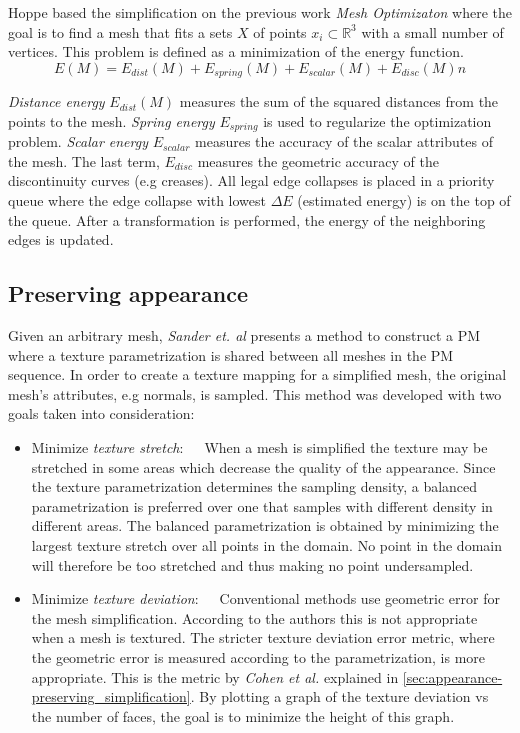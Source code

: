 Hoppe based the simplification on the previous work \emph{Mesh Optimizaton} \cite{hoppe1993mesh} where the goal is to find a mesh that fits a sets $X$ of points \(x_i \subset \mathbb{R}^3\) with a small number of vertices. This problem is defined as a minimization of the energy function.
\begin{equation}
  E(M) = E_{dist}(M) + E_{spring}(M) + E_{scalar}(M) + E_{disc}(M)n
\end{equation}

\emph{Distance energy} $E_{dist}(M)$ measures the sum of the squared distances from the points to the mesh. \emph{Spring energy} $E_{spring}$ is used to regularize the optimization problem. \emph{Scalar energy} $E_{scalar}$ measures the accuracy of the scalar attributes of the mesh. The last term, $E_{disc}$ measures the geometric accuracy of the discontinuity curves (e.g creases). All legal edge collapses is placed in a priority queue where the edge collapse with lowest $\Delta E$ (estimated energy) is on the top of the queue. After a transformation is performed, the energy of the neighboring edges is updated.

\subsection{Preserving appearance} \label{sec:texture_mapped_progressive_meshing}
Given an arbitrary mesh, \emph{Sander et. al} \cite{sander2001texture} presents a method to construct a PM where a texture parametrization is shared between all meshes in the PM sequence. In order to create a texture mapping for a simplified mesh, the original mesh's attributes, e.g normals, is sampled. This method was developed with two goals taken into consideration:
\begin{itemize}
\item{Minimize \emph{texture stretch}:}~~~When a mesh is simplified the texture may be stretched in some areas which decrease the quality of the appearance. Since the texture parametrization determines the sampling density, a balanced parametrization is preferred over one that samples with different density in different areas. The balanced parametrization is obtained by minimizing the largest texture stretch over all points in the domain. No point in the domain will therefore be too stretched and thus making no point undersampled. 
\item{Minimize \emph{texture deviation}:}~~~Conventional methods use geometric error for the mesh simplification. According to the authors this is not appropriate when a mesh is textured. The stricter texture deviation error metric, where the geometric error is measured according to the parametrization, is more appropriate. This is the metric by \emph{Cohen et al.} \cite{cohen1998appearance} explained in \cref{sec:appearance-preserving_simplification}. By plotting a graph of the texture deviation vs the number of faces, the goal is to minimize the height of this graph.
\end{itemize}

